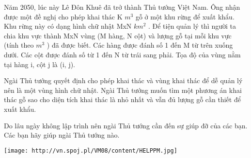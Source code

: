 Năm 2050, lúc này Lê Đôn Khuê đã trở thành Thủ tướng Việt Nam. Ông nhận được một đề nghị cho phép khai thác K $m^{3}$ gỗ ở một khu rừng để xuất khẩu. Khu rừng này có dạng hình chữ nhật MxN $km^{2}$ . Để tiện quản lý thì người ta chia khu vực thành MxN vùng (M hàng, N cột) và lượng gỗ tại mỗi khu vực (tính theo $m^{3}$ ) đã được biết. Các hàng được đánh số 1 đến M từ trên xuống dưới. Các cột được đánh số từ 1 đến N từ trái sang phải. Tọa độ của vùng nằm tại hàng i, cột j là (i, j).

Ngài Thủ tướng quyết định cho phép khai thác và vùng khai thác để dễ quản lý nên là một vùng hình chữ nhật. Ngài Thủ tướng muốn tìm một phương án khai thác gỗ sao cho diện tích khai thác là nhỏ nhất và vẫn đủ lượng gỗ cần thiết để xuất khẩu.

Do lâu ngày không lập trình nên ngài Thủ tướng cần đến sự giúp đỡ của các bạn. Các bạn hãy giúp ngài Thủ tướng nào.


\texttt{[image: http://vn.spoj.pl/VM08/content/HELPPM.jpg]}